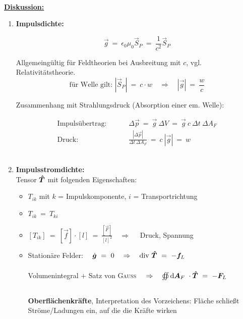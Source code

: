 \ \\
\underline{\textbf{Diskussion:}}

\begin{enumerate}
\item \textbf{Impulsdichte:}

\begin{equation*}
\vec{g} \ = \ \epsilon_0\mu_0 \vec{S}_P \ = \ \frac{1}{c^2}\vec{S}_P
\end{equation*} 

Allgemeingültig für Feldtheorien bei Ausbreitung mit $c$, vgl. Relativitätstheorie.
\begin{equation*}
\text{für Welle gilt: } |\vec{S}_P| \ = \ c \cdot w \quad \Rightarrow \quad |\vec{g}| \ = \ \frac{w}{c} 
\end{equation*}

Zusammenhang mit Strahlungsdruck (Absorption einer em. Welle): 

\begin{align*}
\text{Impulsübertrag:  } \qquad & \Delta \vec{p} \ = \ \vec{g} \ \Delta V \ = \ \vec{g} \ c \ \Delta t \ \Delta A_F\\
\text{Druck: } \qquad & \frac{|\Delta\vec{p}|}{\Delta t \ \Delta A_F} \ = \ c \ |\vec{g}| \ = \ w
\end{align*}
\ \\
\item \textbf{Impulsstromdichte:} \\

Tensor $\bm{\hat{T}}$ mit folgenden Eigenschaften:

\begin{itemize}
\item $T_{ik}$ mit $k$ = Impulskomponente, $i$ = Transportrichtung
\item $T_{ik} \ = \ T_{ki}$
\item $ [T_{ik}] \ = \ [\vec{f}] \cdot [l] \ = \ \frac{[\vec{F}]}{[l]^2} \quad \Rightarrow \quad$ Druck, Spannung
\item Stationäre Felder: $\quad \dot{\vec{g}} \ = \ 0 \quad \Rightarrow \quad \div \tens{T} \ = \ -\vec{f}_L$\\
\ \\
Volumenintegral + Satz von \textsc{Gauss} $ \quad \Rightarrow \quad \oiint\limits_{{}}^{{}}\mathrm{d}{\bm{A}_F}\  \cdot \bm{\hat{T}} \ = \ - \bm{F}_L \quad$\\
\ \\
\textbf{Oberflächenkräfte}, Interpretation des Vorzeichens: Fläche schließt Ströme/Ladungen ein, auf die die Kräfte wirken
\end{itemize}
\end{enumerate}

